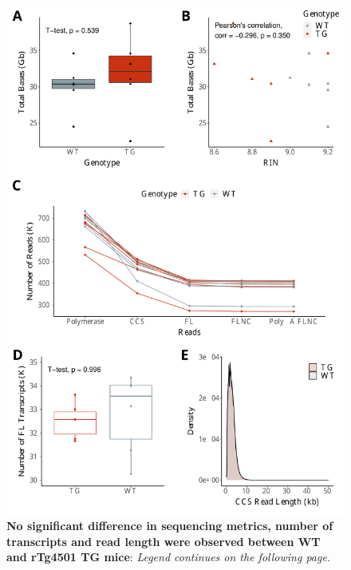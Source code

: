 \begin{figure}[htp]
	\begin{center}
		\includegraphics[page=1,trim={0 0 0 0},clip,scale = 0.55]{Figures/rTg4510WholeTranscriptome.pdf}
	\end{center}
	\captionsetup{width=0.95\textwidth}
	\caption[Iso-Seq sequencing metrics from global transcriptome profiling of rTg4510 mice]%
	{\textbf{No significant difference in sequencing metrics, number of transcripts and read length were observed between WT and rTg4501 TG mice}: \textit{Legend continues on the following page.}}
	\label{fig:rTg4510_sequencing_metrics}
\end{figure}
